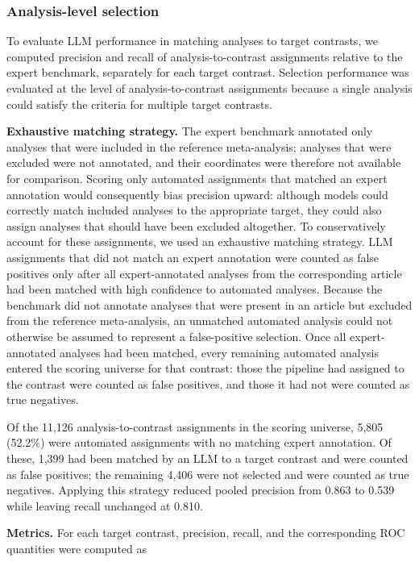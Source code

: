 \subsubsection{Analysis-level selection}

To evaluate LLM performance in matching analyses to target contrasts, we computed precision and recall of analysis-to-contrast assignments relative to the expert benchmark, separately for each target contrast. Selection performance was evaluated at the level of analysis-to-contrast assignments because a single analysis could satisfy the criteria for multiple target contrasts.

\textbf{Exhaustive matching strategy.} The expert benchmark annotated only analyses that were included in the reference meta-analysis; analyses that were excluded were not annotated, and their coordinates were therefore not available for comparison. Scoring only automated assignments that matched an expert annotation would consequently bias precision upward: although models could correctly match included analyses to the appropriate target, they could also assign analyses that should have been excluded altogether. To conservatively account for these assignments, we used an exhaustive matching strategy. LLM assignments that did not match an expert annotation were counted as false positives only after all expert-annotated analyses from the corresponding article had been matched with high confidence to automated analyses. Because the benchmark did not annotate analyses that were present in an article but excluded from the reference meta-analysis, an unmatched automated analysis could not otherwise be assumed to represent a false-positive selection. Once all expert-annotated analyses had been matched, every remaining automated analysis entered the scoring universe for that contrast: those the pipeline had assigned to the contrast were counted as false positives, and those it had not were counted as true negatives.

Of the 11,126 analysis-to-contrast assignments in the scoring universe, 5,805 (52.2\%) were automated assignments with no matching expert annotation. Of these, 1,399 had been matched by an LLM to a target contrast and were counted as false positives; the remaining 4,406 were not selected and were counted as true negatives. Applying this strategy reduced pooled precision from 0.863 to 0.539 while leaving recall unchanged at 0.810.

\textbf{Metrics.} For each target contrast, precision, recall, and the corresponding ROC quantities were computed as

